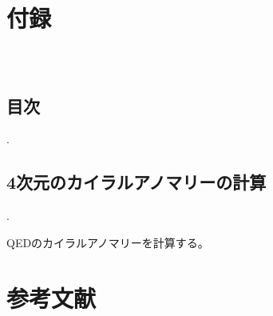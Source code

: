 \documentclass[
  unicode,a4paper,9pt,
  xcolor = {dvipsnames,svgnames},
  hyperref ={colorlinks=true,citecolor=Navy,linkcolor=NavyBlue,urlcolor=purple},
  ja=standard,lualatex
]{beamer}
\begin{document}
\section{付録}

\begin{frame}[plain]
  \frametitle{\ }
  \huge \secname
\end{frame}

\subsection{目次}

\begin{frame}{\thesubsection. \subsecname}
  \tableofcontents
\end{frame}



\subsection{4次元のカイラルアノマリーの計算}


\begin{frame}{\thesubsection. \subsecname}

  QEDのカイラルアノマリーを計算する。
  

\end{frame}


\section{参考文献}
\begin{frame}{\secname}

  \scriptsize
  \beamertemplatetextbibitems
  
  

\end{frame}

\setcounter{framenumber}{\value{Appendix}}
\end{document}
